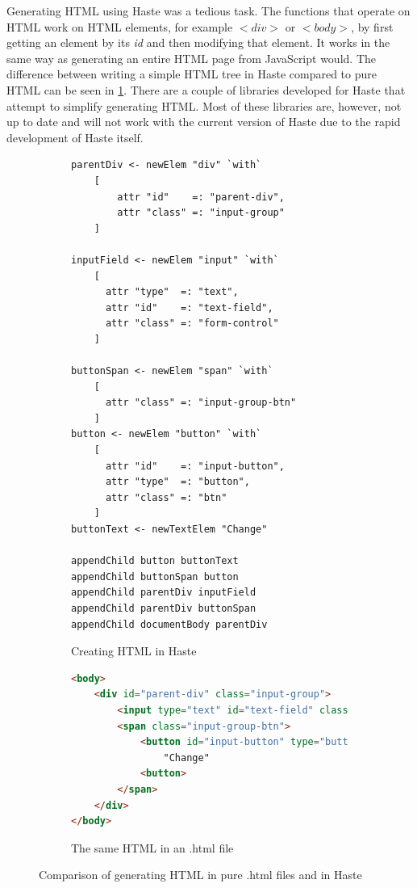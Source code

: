 \documentclass[a4paper]{article}
\begin{document}

Generating HTML using Haste was a tedious task. The functions that operate on HTML work on HTML elements, for example $<div>$ or $<body>$, by first getting an element by its \textit{id} and then modifying that element. It works in the same way as generating an entire HTML page from JavaScript would. The difference between writing a simple HTML tree in Haste compared to pure HTML can be seen in \cref{fig:HTML-generation}. There are a couple of libraries developed for Haste that attempt to simplify generating HTML. Most of these libraries are, however, not up to date and will not work with the current version of Haste due to the rapid development of Haste itself. 

\begin{figure}[h!]
    \centering
\begin{subfigure}[b]{\textwidth}
\begin{lstlisting}
parentDiv <- newElem "div" `with`
    [
        attr "id"    =: "parent-div",
        attr "class" =: "input-group"
    ]

inputField <- newElem "input" `with`
    [
      attr "type"  =: "text",
      attr "id"    =: "text-field",
      attr "class" =: "form-control"
    ]

buttonSpan <- newElem "span" `with`
    [
      attr "class" =: "input-group-btn"
    ]
button <- newElem "button" `with`
    [
      attr "id"    =: "input-button",
      attr "type"  =: "button",
      attr "class" =: "btn"
    ]
buttonText <- newTextElem "Change"

appendChild button buttonText
appendChild buttonSpan button
appendChild parentDiv inputField
appendChild parentDiv buttonSpan
appendChild documentBody parentDiv

\end{lstlisting}
\caption{Creating HTML in Haste}
\end{subfigure}


\begin{subfigure}[b]{\textwidth}
\begin{lstlisting}[language=HTML]
<body>
    <div id="parent-div" class="input-group">
        <input type="text" id="text-field" class="form-control">
        <span class="input-group-btn">
            <button id="input-button" type="button" class="btn">
                "Change"
            <button>
        </span>
    </div>
</body>

\end{lstlisting}
\caption{The same HTML in an .html file}
\end{subfigure}

\caption{Comparison of generating HTML in pure .html files and in Haste}
\label{fig:HTML-generation}
\end{figure}
\end{document}
